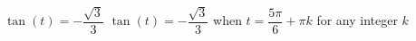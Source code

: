 {$\tan(t) = -\dfrac{\sqrt{3}}{3}$}
{$\tan(t) = -\dfrac{\sqrt{3}}{3}$ when $t = \dfrac{5\pi}{6} + \pi k$ for any integer $k$}
